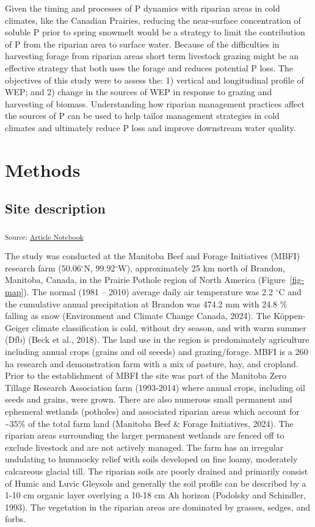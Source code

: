 \documentclass[
]{agujournal2019}
\begin{document}
Given the timing and processes of P dynamics with riparian areas in cold
climates, like the Canadian Prairies, reducing the near-surface
concentration of soluble P prior to spring snowmelt would be a strategy
to limit the contribution of P from the riparian area to surface water.
Because of the difficulties in harvesting forage from riparian areas
short term livestock grazing might be an effective strategy that both
uses the forage and reduces potential P loss. The objectives of this
study were to assess the: 1) vertical and longitudinal profile of WEP;
and 2) change in the sources of WEP in response to grazing and
harvesting of biomass. Understanding how riparian management practices
affect the sources of P can be used to help tailor management strategies
in cold climates and ultimately reduce P loss and improve downstream
water quality.

\section{Methods}\label{methods}

\subsection{Site description}\label{site-description}

\textsubscript{Source:
\href{https://alex-koiter.github.io/riparian-grazing-manuscript/index.qmd.html}{Article
Notebook}}

The study was conducted at the Manitoba Beef and Forage Initiatives
(MBFI) research farm (50.06\(^\circ\)N, 99.92\(^\circ\)W), approximately
25 km north of Brandon, Manitoba, Canada, in the Prairie Pothole region
of North America (Figure~\ref{fig-map}). The normal (1981 -- 2010)
average daily air temperature was 2.2 \(^\circ\)C and the cumulative
annual precipitation at Brandon was 474.2 mm with 24.8 \% falling as
snow (Environment and Climate Change Canada, 2024). The Köppen-Geiger
climate classification is cold, without dry season, and with warm summer
(Dfb) (Beck et al., 2018). The land use in the region is predominately
agriculture including annual crops (grains and oil seeeds) and
grazing/forage. MBFI is a 260 ha research and demonstration farm with a
mix of pasture, hay, and cropland. Prior to the establishment of MBFI
the site was part of the Manitoba Zero Tillage Research Association farm
(1993-2014) where annual crops, including oil seeds and grains, were
grown. There are also numerous small permanent and ephemeral wetlands
(potholes) and associated riparian areas which account for
\textasciitilde35\% of the total farm land (Manitoba Beef \& Forage
Initiatives, 2024). The riparian areas surrounding the larger permanent
wetlands are fenced off to exclude livestock and are not actively
managed. The farm has an irregular undulating to hummocky relief with
soils developed on fine loamy, moderately calcareous glacial till. The
riparian soils are poorly drained and primarily consist of Humic and
Luvic Gleysols and generally the soil profile can be described by a 1-10
cm organic layer overlying a 10-18 cm Ah horizon (Podolsky and
Schindler, 1993). The vegetation in the riparian areas are dominated by
grasses, sedges, and forbs.
\end{document}
